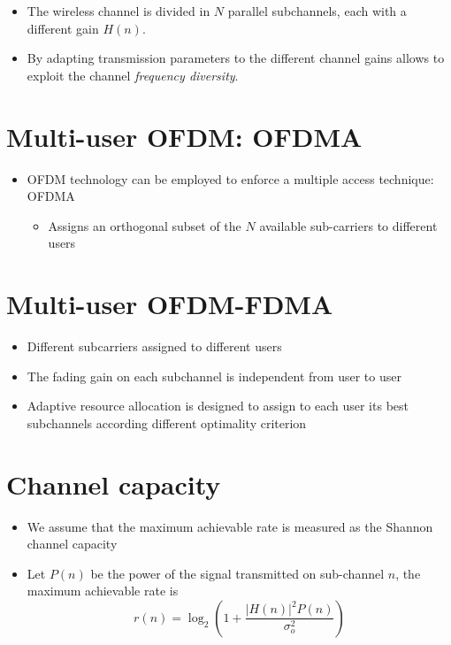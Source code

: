 \begin{itemize}
    \item The wireless channel is divided in \( N \) parallel subchannels, each with a different gain \( H(n) \).
    \item By adapting transmission parameters to the different channel gains allows to exploit the channel \textit{frequency diversity}.
\end{itemize}

\section*{Multi-user OFDM: OFDMA}

\begin{itemize}
    \item OFDM technology can be employed to enforce a multiple access technique: OFDMA
    \begin{itemize}
        \item Assigns an orthogonal subset of the \( N \) available sub-carriers to different users
    \end{itemize}
\end{itemize}


\section*{Multi-user OFDM-FDMA}

\begin{itemize}
    \item Different subcarriers assigned to different users
    \item The fading gain on each subchannel is independent from user to user
    \item Adaptive resource allocation is designed to assign to each user its best subchannels according different optimality criterion
\end{itemize}

\section*{Channel capacity}

\begin{itemize}
    \item We assume that the maximum achievable rate is measured as the Shannon channel capacity
    \item Let \( P(n) \) be the power of the signal transmitted on sub-channel \( n \), the maximum achievable rate is 
    \[ r(n) = \log_2 \left( 1 + \frac{|H(n)|^2 P(n)}{\sigma_o^2} \right) \]
\end{itemize}
